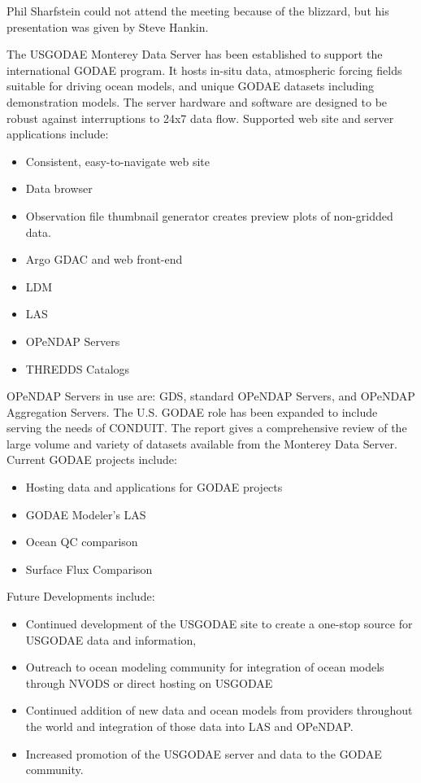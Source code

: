 Phil Sharfstein could not attend the meeting because of the blizzard, but
his presentation was given by Steve Hankin.  

The \ac{USGODAE} Monterey Data Server has been established to support
the international \ac{GODAE} program.  It hosts in-situ data, atmospheric
forcing fields suitable for driving ocean models, and unique \ac{GODAE}
datasets including demonstration models.  The server hardware and
software are designed to be robust against interruptions to 24x7
data flow.  Supported web site and server applications include:

\begin{itemize}
  \item Consistent, easy-to-navigate web site
  \item Data browser
  \item Observation file thumbnail generator creates preview plots
        of non-gridded data.
  \item Argo \ac{GDAC} and web front-end
  \item \ac{LDM}
  \item \ac{LAS}
  \item \ac{OPeNDAP} Servers
  \item \ac{THREDDS} Catalogs
\end{itemize}

\ac{OPeNDAP} Servers in use are: \ac{GDS}, standard \ac{OPeNDAP} 
Servers, and \ac{OPeNDAP} Aggregation Servers.  The U.S. \ac{GODAE}
role has been expanded to include serving the needs of \ac{CONDUIT}.
The report gives a comprehensive review of the large volume and
variety of datasets available from the Monterey Data Server.  
Current GODAE projects include:

\begin{itemize}
  \item Hosting data and applications for \ac{GODAE} projects
  \item \ac{GODAE} Modeler's LAS
  \item Ocean QC comparison
  \item Surface Flux Comparison
\end{itemize}

Future Developments include:

\begin{itemize}
  \item Continued development of the \ac{USGODAE} site to create a one-stop
        source for \ac{USGODAE} data and information,
  \item Outreach to ocean modeling community for integration of ocean
        models through NVODS or direct hosting on \ac{USGODAE}
  \item Continued addition of new data and ocean models from providers 
        throughout the world and integration of those data into
        \ac{LAS} and \ac{OPeNDAP}.
  \item Increased promotion of the \ac{USGODAE} server and data to the
        \ac{GODAE} community.
\end{itemize}
%
%
%
%

